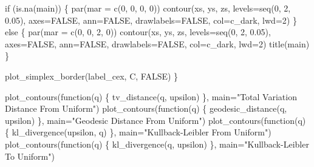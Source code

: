 \documentclass[
  letterpaper,
  DIV=11,
  numbers=noendperiod]{scrartcl}
\newenvironment{Shaded}{\begin{snugshade}}{\end{snugshade}}
\newcommand{\AttributeTok}[1]{\textcolor[rgb]{0.40,0.45,0.13}{#1}}
\newcommand{\ConstantTok}[1]{\textcolor[rgb]{0.56,0.35,0.01}{#1}}
\newcommand{\ControlFlowTok}[1]{\textcolor[rgb]{0.00,0.23,0.31}{#1}}
\newcommand{\DecValTok}[1]{\textcolor[rgb]{0.68,0.00,0.00}{#1}}
\newcommand{\FloatTok}[1]{\textcolor[rgb]{0.68,0.00,0.00}{#1}}
\newcommand{\FunctionTok}[1]{\textcolor[rgb]{0.28,0.35,0.67}{#1}}
\newcommand{\NormalTok}[1]{\textcolor[rgb]{0.00,0.23,0.31}{#1}}
\newcommand{\StringTok}[1]{\textcolor[rgb]{0.13,0.47,0.30}{#1}}
\begin{document}
\begin{Shaded}
\begin{Highlighting}[]
  \ControlFlowTok{if}\NormalTok{ (}\FunctionTok{is.na}\NormalTok{(main)) \{}
    \FunctionTok{par}\NormalTok{(}\AttributeTok{mar =} \FunctionTok{c}\NormalTok{(}\DecValTok{0}\NormalTok{, }\DecValTok{0}\NormalTok{, }\DecValTok{0}\NormalTok{, }\DecValTok{0}\NormalTok{))}
    \FunctionTok{contour}\NormalTok{(xs, ys, zs, }\AttributeTok{levels=}\FunctionTok{seq}\NormalTok{(}\DecValTok{0}\NormalTok{, }\DecValTok{2}\NormalTok{, }\FloatTok{0.05}\NormalTok{),}
            \AttributeTok{axes=}\ConstantTok{FALSE}\NormalTok{, }\AttributeTok{ann=}\ConstantTok{FALSE}\NormalTok{,}
            \AttributeTok{drawlabels=}\ConstantTok{FALSE}\NormalTok{, }\AttributeTok{col=}\NormalTok{c\_dark, }\AttributeTok{lwd=}\DecValTok{2}\NormalTok{)}
\NormalTok{  \} }\ControlFlowTok{else}\NormalTok{ \{}
    \FunctionTok{par}\NormalTok{(}\AttributeTok{mar =} \FunctionTok{c}\NormalTok{(}\DecValTok{0}\NormalTok{, }\DecValTok{0}\NormalTok{, }\DecValTok{2}\NormalTok{, }\DecValTok{0}\NormalTok{))}
    \FunctionTok{contour}\NormalTok{(xs, ys, zs, }\AttributeTok{levels=}\FunctionTok{seq}\NormalTok{(}\DecValTok{0}\NormalTok{, }\DecValTok{2}\NormalTok{, }\FloatTok{0.05}\NormalTok{),}
            \AttributeTok{axes=}\ConstantTok{FALSE}\NormalTok{, }\AttributeTok{ann=}\ConstantTok{FALSE}\NormalTok{,}
            \AttributeTok{drawlabels=}\ConstantTok{FALSE}\NormalTok{, }\AttributeTok{col=}\NormalTok{c\_dark, }\AttributeTok{lwd=}\DecValTok{2}\NormalTok{)}
    \FunctionTok{title}\NormalTok{(main)}
\NormalTok{  \}}

  \FunctionTok{plot\_simplex\_border}\NormalTok{(label\_cex, C, }\ConstantTok{FALSE}\NormalTok{)}
\NormalTok{\}}
\end{Highlighting}
\end{Shaded}

\begin{Shaded}
\begin{Highlighting}[]
\FunctionTok{plot\_contours}\NormalTok{(}\ControlFlowTok{function}\NormalTok{(q) \{ }\FunctionTok{tv\_distance}\NormalTok{(q, upsilon) \},}
              \AttributeTok{main=}\StringTok{"Total Variation Distance From Uniform"}\NormalTok{)}
\FunctionTok{plot\_contours}\NormalTok{(}\ControlFlowTok{function}\NormalTok{(q) \{ }\FunctionTok{geodesic\_distance}\NormalTok{(q, upsilon) \},}
              \AttributeTok{main=}\StringTok{"Geodesic Distance From Uniform"}\NormalTok{)}
\FunctionTok{plot\_contours}\NormalTok{(}\ControlFlowTok{function}\NormalTok{(q) \{ }\FunctionTok{kl\_divergence}\NormalTok{(upsilon, q) \},}
              \AttributeTok{main=}\StringTok{"Kullback{-}Leibler From Uniform"}\NormalTok{)}
\FunctionTok{plot\_contours}\NormalTok{(}\ControlFlowTok{function}\NormalTok{(q) \{ }\FunctionTok{kl\_divergence}\NormalTok{(q, upsilon) \},}
              \AttributeTok{main=}\StringTok{"Kullback{-}Leibler To Uniform"}\NormalTok{)}
\end{Highlighting}
\end{Shaded}
\end{document}
